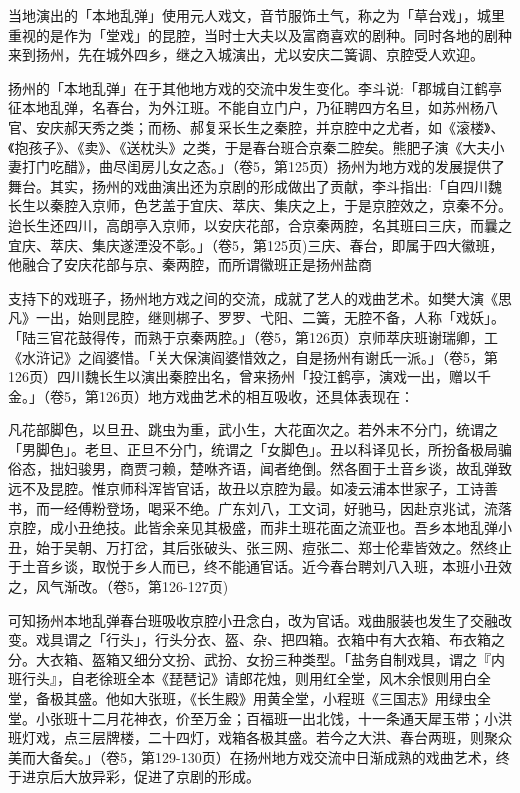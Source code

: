 当地演出的「本地乱弹」使用元人戏文，音节服饰土气，称之为「草台戏」，城里重视的是作为「堂戏」的昆腔，当时士大夫以及富商喜欢的剧种。同时各地的剧种来到扬州，先在城外四乡，继之入城演出，尤以安庆二簧调、京腔受人欢迎。

扬州的「本地乱弹」在于其他地方戏的交流中发生变化。李斗说:「郡城自江鹤亭征本地乱弹，名春台，为外江班。不能自立门户，乃征聘四方名旦，如苏州杨八官、安庆郝天秀之类；而杨、郝复采长生之秦腔，并京腔中之尤者，如《滚楼》、《抱孩子》、《卖》、《送枕头》之类，于是春台班合京秦二腔矣。熊肥子演《大夫小妻打门吃醋》，曲尽闺房儿女之态。」（卷5，第125页）扬州为地方戏的发展提供了舞台。其实，扬州的戏曲演出还为京剧的形成做出了贡献，李斗指出:「自四川魏长生以秦腔入京师，色艺盖于宜庆、萃庆、集庆之上，于是京腔效之，京秦不分。迨长生还四川，高朗亭入京师，以安庆花部，合京秦两腔，名其班曰三庆，而曩之宜庆、萃庆、集庆遂湮没不彰。」（卷5，第125页)三庆、春台，即属于四大徽班，他融合了安庆花部与京、秦两腔，而所谓徽班正是扬州盐商

\vfill
\begin{BookNotes}
\end{BookNotes}

\noindent 支持下的戏班子，扬州地方戏之间的交流，成就了艺人的戏曲艺术。如樊大演《思凡》一出，始则昆腔，继则梆子、罗罗、弋阳、二簧，无腔不备，人称「戏妖」。「陆三官花鼓得传，而熟于京秦两腔。」（卷5，第126页）京师萃庆班谢瑞卿，工《水浒记》之阎婆惜。「关大保演阎婆惜效之，自是扬州有谢氏一派。」（卷5，第126页）四川魏长生以演出秦腔出名，曾来扬州「投江鹤亭，演戏一出，赠以千金。」（卷5，第126页）地方戏曲艺术的相互吸收，还具体表现在：

\begin{BookQuote}
凡花部脚色，以旦丑、跳虫为重，武小生，大花面次之。若外末不分门，统谓之「男脚色」。老旦、正旦不分门，统谓之「女脚色」。丑以科译见长，所扮备极局骗俗态，拙妇骏男，商贾刁赖，楚咻齐语，闻者绝倒。然各囿于土音乡谈，故乱弹致远不及昆腔。惟京师科浑皆官话，故丑以京腔为最。如凌云浦本世家子，工诗善书，而一经傅粉登场，喝采不绝。广东刘八，工文词，好驰马，因赴京兆试，流落京腔，成小丑绝技。此皆余亲见其极盛，而非土班花面之流亚也。吾乡本地乱弹小丑，始于吴朝、万打岔，其后张破头、张三网、痘张二、郑士伦辈皆效之。然终止于土音乡谈，取悦于乡人而已，终不能通官话。近今春台聘刘八入班，本班小丑效之，风气渐改。（卷5，第126-127页)
\end{BookQuote}

可知扬州本地乱弹春台班吸收京腔小丑念白，改为官话。戏曲服装也发生了交融改变。戏具谓之「行头」，行头分衣、盔、杂、把四箱。衣箱中有大衣箱、布衣箱之分。大衣箱、盔箱又细分文扮、武扮、女扮三种类型。「盐务自制戏具，谓之『内班行头』，自老徐班全本《琵琶记》请郎花烛，则用红全堂，风木余恨则用白全堂，备极其盛。他如大张班，《长生殿》用黄全堂，小程班《三国志》用绿虫全堂。小张班十二月花神衣，价至万金；百福班一出北饯，十一条通天犀玉带；小洪班灯戏，点三层牌楼，二十四灯，戏箱各极其盛。若今之大洪、春台两班，则聚众美而大备矣。」（卷5，第129-130页）在扬州地方戏交流中日渐成熟的戏曲艺术，终于进京后大放异彩，促进了京剧的形成。


